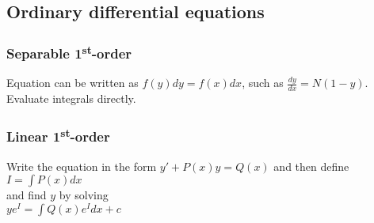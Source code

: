 \documentclass[letterpaper,landscape,10pt]{article}
\begin{document}
{\begin{multicols}{3}
	\subsection*{Ordinary differential equations}
		\subsubsection*{Separable 1\textsuperscript{st}-order}
			Equation can be written as $f(y)dy = f(x)dx$, such as
			$\frac{dy}{dx} = N(1-y)$.  Evaluate integrals directly.

		\subsubsection*{Linear 1\textsuperscript{st}-order}%
			Write the equation in the form $ y' + P(x)y = Q(x) $ and then
			define\\
			{\centering $ I = \int P(x)dx $\\}
			and find $y$ by solving \\
			{\centering $ ye^{I} = \int Q(x)e^{I}dx+c $\\}



\end{multicols}}
\end{document}
